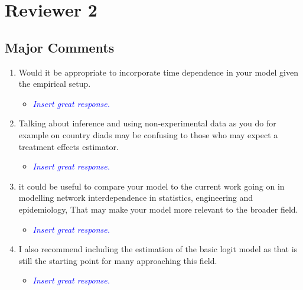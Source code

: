\section{Reviewer 2}

\subsection{Major Comments}

\begin{enumerate}
	\item Would it be appropriate to incorporate time dependence in your model given the empirical setup.
	\begin{itemize}
		\item \textcolor{blue}{ \emph{
		Insert great response.
		}}
	\end{itemize}
	\item Talking about inference and using non-experimental data as you do for example on country diads may be confusing to those who may expect a treatment effects estimator.
	\begin{itemize}
		\item \textcolor{blue}{ \emph{
		Insert great response.
		}}
	\end{itemize}	
	\item it could be useful to compare your model to the current work going on in modelling network interdependence in statistics, engineering and epidemiology, That may make your model more relevant to the broader field.
	\begin{itemize}
		\item \textcolor{blue}{ \emph{
		Insert great response.
		}}
	\end{itemize}	
	\item I also recommend including the estimation of the basic logit model as that is still the starting point for many approaching this field.
	\begin{itemize}
		\item \textcolor{blue}{ \emph{
		Insert great response.
		}}
	\end{itemize}	
\end{enumerate}